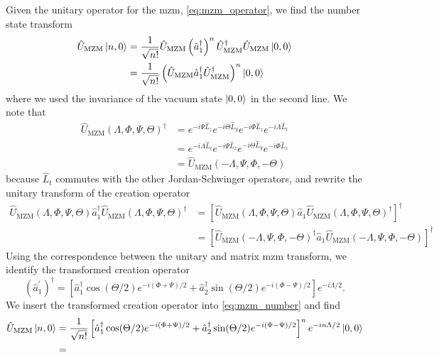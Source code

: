 Given the unitary operator for the \gls{mzm}, \cref{eq:mzm_operator}, we find the number state transform
\begin{equation}
	\begin{split}
		\hat{U}_\text{MZM}
		\ket{n,0}
		&=
		\frac{1}{\sqrt{n!}}
		\hat{U}_\text{MZM}
		\left(\hat{a}_1^\dagger\right)^n
		\hat{U}_\text{MZM}^\dagger
		\hat{U}_\text{MZM}
		\ket{0,0}
		\\
		&=
		\frac{1}{\sqrt{n!}}
		\left(
			\hat{U}_\text{MZM}
			\hat{a}_1^\dagger
			\hat{U}_\text{MZM}^\dagger
		\right)^n
		\ket{0,0}
	\end{split}
	\label{eq:mzm_number}
\end{equation}
where we used the invariance of the vacuum state $\ket{0,0}$ in the second line.
We note that
\begin{equation}
	\begin{split}
		\hat{U}_\text{MZM}(\Lambda,\Phi,\Psi,\Theta)^\dagger
		&=
		e^{-i\Psi\hat{L}_z}
		e^{-i\Theta\hat{L}_y}
		e^{-i\Phi\hat{L}_z}
		e^{-i\Lambda\hat{L}_t}
		\\
		&=
		e^{-i\Lambda\hat{L}_t}
		e^{-i\Psi\hat{L}_z}
		e^{-i\Theta\hat{L}_y}
		e^{-i\Phi\hat{L}_z}
		\\
		&=
		\hat{U}_\text{MZM}(-\Lambda,\Psi,\Phi,-\Theta)
	\end{split}
\end{equation}
because $\hat{L}_t$ commutes with the other Jordan-Schwinger operators, and rewrite the unitary transform of the creation operator
\begin{equation}
	\begin{split}
		\hat{U}_\text{MZM}(\Lambda,\Phi,\Psi,\Theta)
		\hat{a}_1^\dagger
		\hat{U}_\text{MZM}(\Lambda,\Phi,\Psi,\Theta)^\dagger
		&=
		\left[
			\hat{U}_\text{MZM}(\Lambda,\Phi,\Psi,\Theta)
			\hat{a}_1
			\hat{U}_\text{MZM}(\Lambda,\Phi,\Psi,\Theta)^\dagger
		\right]^\dagger
		\\
		&=
		\left[
			\hat{U}_\text{MZM}(-\Lambda,\Psi,\Phi,-\Theta)^\dagger
			\hat{a}_1
			\hat{U}_\text{MZM}(-\Lambda,\Psi,\Phi,-\Theta)
		\right]^\dagger
	\end{split}
\end{equation}
Using the correspondence between the unitary and matrix \gls{mzm} transform, we identify the transformed creation operator
\begin{equation}
	\left(\hat{a}_1^\prime\right)^\dagger
	=
	\left[
		\hat{a}_1^\dagger
		\cos(\Theta/2)
		e^{-i(\Phi+\Psi)/2}
		+
		\hat{a}_2^\dagger
		\sin(\Theta/2)
		e^{-i(\Phi-\Psi)/2}
	\right]
	e^{-i\Lambda/2}
	.
\end{equation}
We insert the transformed creation operator into \cref{eq:mzm_number} and find
\begin{equation}
	\begin{split}
		\hat{U}_\text{MZM}
		\ket{n,0}
		&=
		\frac{1}{\sqrt{n!}}
		\left[
			\hat{a}_1^\dagger
			\cos(\Theta/2)
			e^{-i(\Phi+\Psi)/2}
			+
			\hat{a}_2^\dagger
			\sin(\Theta/2)
			e^{-i(\Phi-\Psi)/2}
		\right]^n
		e^{-in\Lambda/2}
		\ket{0,0}
		\\
		&=
	\end{split}
\end{equation}

